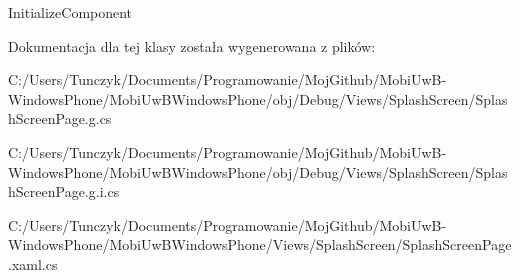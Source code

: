 Initialize\+Component 



Dokumentacja dla tej klasy została wygenerowana z plików\+:\begin{DoxyCompactItemize}
\item 
C\+:/\+Users/\+Tunczyk/\+Documents/\+Programowanie/\+Moj\+Github/\+Mobi\+Uw\+B-\/\+Windows\+Phone/\+Mobi\+Uw\+B\+Windows\+Phone/obj/\+Debug/\+Views/\+Splash\+Screen/Splash\+Screen\+Page.\+g.\+cs\item 
C\+:/\+Users/\+Tunczyk/\+Documents/\+Programowanie/\+Moj\+Github/\+Mobi\+Uw\+B-\/\+Windows\+Phone/\+Mobi\+Uw\+B\+Windows\+Phone/obj/\+Debug/\+Views/\+Splash\+Screen/Splash\+Screen\+Page.\+g.\+i.\+cs\item 
C\+:/\+Users/\+Tunczyk/\+Documents/\+Programowanie/\+Moj\+Github/\+Mobi\+Uw\+B-\/\+Windows\+Phone/\+Mobi\+Uw\+B\+Windows\+Phone/\+Views/\+Splash\+Screen/Splash\+Screen\+Page.\+xaml.\+cs\end{DoxyCompactItemize}
